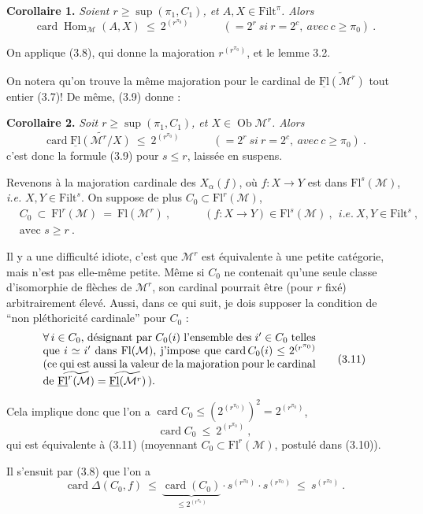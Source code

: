 \documentclass[11pt]{article}
\newcommand{\printedpage}[1]{\marginpar{\footnotesize p.~#1}}
\newcommand{\msp}[1]{\marginpar{\footnotesize [#1]}}
\newcommand{\M}{\mathcal{M}}
\newcommand{\Filt}{\mathrm{Filt}}
\newcommand{\Fl}{\mathrm{Fl}}
\newcommand{\uFl}{\underline{\mathrm{Fl}}}
\newcommand{\card}{\operatorname{card}}
\newcommand{\Hom}{\operatorname{Hom}}
\newcommand{\Ob}{\operatorname{Ob}}
\newcommand{\wavy}[1]{\widetilde{#1}}
\begin{document}
\textbf{Corollaire 1.} \textit{Soient $r\geq\sup(\pi_1,C_1)$, et $A,X\in\Filt^\pi$. Alors}
\[
\card\Hom_{\M}(A,X)\ \leq\ 2^{(r^{\pi_0})}\qquad\quad(=2^r\ \textit{si}\ r=2^c,\ \textit{avec}\ c\geq\pi_0)\ . \tag*{(3.10)}
\]

On applique (3.8), qui donne la majoration $r^{(r^{\pi_0})}$, et le lemme 3.2.

On notera qu'on trouve la même majoration pour le cardinal de $\wavy{\uFl(\M^r)}$ tout entier (3.7)! De même, (3.9) donne :

\textbf{Corollaire 2.} \textit{Soit $r\geq\sup(\pi_1,C_1)$, et $X\in\Ob\M^r$. Alors}
\[
\card\wavy{\uFl(\M^r/X)}\ \leq\ 2^{(r^{\pi_0})}\qquad\quad(=2^r\ \textit{si}\ r=2^c,\ \textit{avec}\ c\geq\pi_0)\ . \tag*{(3.11)}
\]
c'est donc la formule (3.9) pour $s\leq r$, laissée en suspens.

\msp{page 24}
Revenons à la majoration cardinale des $X_\alpha(f)$, où $f : X\longrightarrow Y$ est dans $\Fl^s(\M)$, \textit{i.e.} $X,Y\in\Filt^s$. On suppose de plus $C_0\subset\Fl^r(\M)$,
\[
\begin{aligned}
&C_0\ \subset\ \Fl^r(\M)\ =\ \Fl(\M^r)\ ,\qquad\quad(f:X\longrightarrow Y)\in\Fl^s(\M)\ ,\ \ \textit{i.e.}\ X,Y\in\Filt^s\ ,\\
&\text{avec } s\geq r\ .
\end{aligned} \tag*{(3.10)}
\]

 Il y a une difficulté idiote, c'est que $\M^r$ est équivalente à une petite catégorie, mais n'est pas elle-même petite. Même si $C_0$ ne contenait qu'une seule classe d'isomorphie de flèches de $\M^r$, son cardinal pourrait être (pour $r$ fixé) arbitrairement élevé. Aussi, dans ce qui suit, je dois supposer la condition de “non pléthoricité cardinale” pour $C_0$ :
\[
\parbox{0.72\linewidth}{$\forall\,i\in C_0$, désignant par $C_0(i)$ l'ensemble des $i'\in C_0$ telles que $i\simeq i'$ dans $\Fl(\M)$, j'impose que $\card C_0(i)\leq 2^{(r^{\pi_0})}$ (ce qui est aussi la valeur de la majoration pour le cardinal de $\wavy{\uFl^r(\M)}=\wavy{\uFl(\M^r)}$\,).} \tag*{(3.11)}
\]

\printedpage{17}
 Cela implique donc que l'on a $\card C_0\leq(2^{(r^{\pi_0})})^2=2^{(r^{\pi_0})}$,
\[
\card C_0\ \leq\ 2^{(r^{\pi_0})}\ , \tag*{(3.12)}
\]
qui est équivalente à (3.11) (moyennant $C_0\subset\Fl^r(\M)$, postulé dans (3.10)).

Il s'ensuit par (3.8) que l'on a
\[
\card\Delta(C_0,f)\ \leq\ \underbrace{\card(C_0)}_{\leq 2^{(r^{\pi_0})}}\cdot s^{(r^{\pi_0})}\cdot s^{(r^{\pi_0})}\ \leq\ s^{(r^{\pi_0})}\ .
\]
\end{document}
